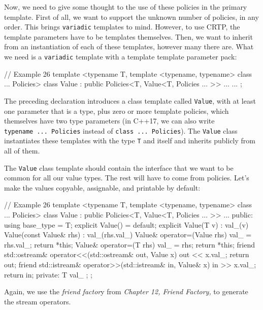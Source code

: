 Now, we need to give some thought to the use of these policies in the primary template. First of all, we want to support the unknown number of policies, in any order. This brings \texttt{variadic} templates to mind. However, to use CRTP, the template parameters have to be templates themselves. Then, we want to inherit from an instantiation of each of these templates, however many there are. What we need is a \texttt{variadic} template with a template template parameter pack:

\begin{code}
// Example 26
template <typename T,
          template <typename, typename> class ... Policies>
class Value :
  public Policies<T, Value<T, Policies ... >> ...
{ ... };
\end{code}

The preceding declaration introduces a class template called \texttt{Value}, with at least one parameter that is a type, plus zero or more template policies, which themselves have two type parameters (in C++17, we can also write \texttt{typename\ ...\ Policies} instead of \texttt{class\ ...\ Policies}). The \texttt{Value} class instantiates these templates with the type \texttt{T} and itself and inherits publicly from all of them.

The \texttt{Value} class template should contain the interface that we want to be common for all our value types. The rest will have to come from policies. Let's make the values copyable, assignable, and printable by default:

\begin{code}
// Example 26
template <typename T,
          template <typename, typename> class ... Policies>
class Value :
  public Policies<T, Value<T, Policies ... >> ...
{
  public:
  using base_type = T;
  explicit Value() = default;
  explicit Value(T v) : val_(v) {}
  Value(const Value& rhs) : val_(rhs.val_) {}
  Value& operator=(Value rhs) {
    val_ = rhs.val_;
    return *this;
  }
  Value& operator=(T rhs) { val_ = rhs; return *this; }
  friend std::ostream&
  operator<<(std::ostream& out, Value x) {
    out << x.val_; return out;
  }
  friend std::istream&
    operator>>(std::istream& in, Value& x) {
    in >> x.val_; return in;
  }
  private:
  T val_ {};
};
\end{code}

Again, we use the \emph{friend factor}y from \emph{Chapter 12, Friend Factory,} to generate the stream operators.

